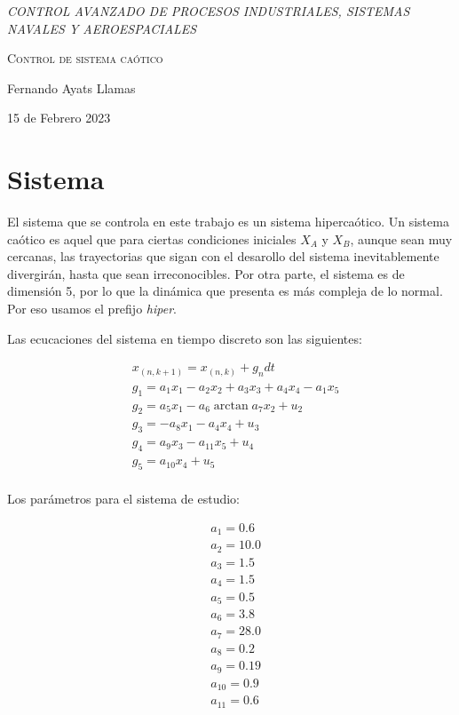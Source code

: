 \documentclass[DIV=20]{scrartcl}
\begin{document}
\begin{titlepage}
	\centering
	\vspace{3cm}
	{\itshape\Large CONTROL AVANZADO DE PROCESOS INDUSTRIALES, SISTEMAS NAVALES Y AEROESPACIALES	 \par}
	\vspace{3cm}
	{\scshape\Huge Control de sistema caótico \par}
	\vfill
	{\Large Fernando Ayats Llamas \par}
	{\Large 15 de Febrero 2023 \par}
\end{titlepage}

\section{Sistema}

El sistema que se controla en este trabajo es un sistema hipercaótico. Un
sistema caótico es aquel que para ciertas condiciones iniciales $X_A$ y $X_B$,
aunque sean muy cercanas, las trayectorias que sigan con el desarollo del
sistema inevitablemente divergirán, hasta que sean irreconocibles.
Por otra parte, el sistema es de dimensión 5, por lo que la dinámica que
presenta es más compleja de lo normal. Por eso usamos el prefijo \emph{hiper}.

Las ecucaciones del sistema en tiempo discreto son las siguientes:


\begin{align*}
	 & x_{(n, k+1)} = x_{(n, k)} + g_n  dt                   \\
	 & g_1 = a_1 x_1 - a_2 x_2 + a_3 x_3 + a_4 x_4 - a_1 x_5 \\
	 & g_2 = a_5 x_1 - a_6 \arctan{a_7 x_2} + u_2            \\
	 & g_3 = - a_8 x_1 - a_4 x_4 + u_3                       \\
	 & g_4 = a_9 x_3 - a_{11} x_5 + u_4                      \\
	 & g_5 = a_{10} x _4 + u_5                               \\
\end{align*}

Los parámetros para el sistema de estudio:

\begin{align*}
	 & a_1 = 0.6    \\
	 & a_2 = 10.0   \\
	 & a_3 = 1.5    \\
	 & a_4 = 1.5    \\
	 & a_5 = 0.5    \\
	 & a_6 = 3.8    \\
	 & a_7 = 28.0   \\
	 & a_8 = 0.2    \\
	 & a_9 = 0.19   \\
	 & a_{10} = 0.9 \\
	 & a_{11} = 0.6 \\
\end{align*}
\end{document}
